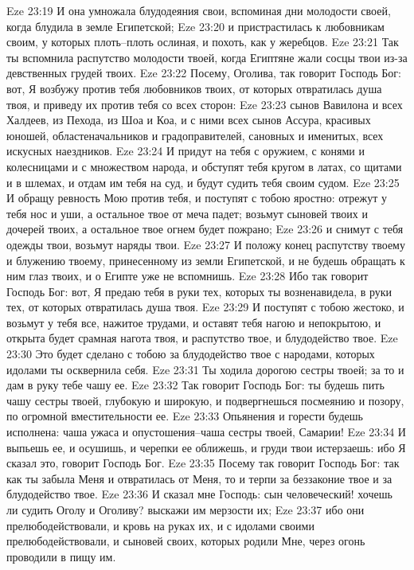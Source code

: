 Eze 23:19  И она умножала блудодеяния свои, вспоминая дни молодости своей, когда блудила в земле Египетской;
Eze 23:20  и пристрастилась к любовникам своим, у которых плоть--плоть ослиная, и похоть, как у жеребцов.
Eze 23:21  Так ты вспомнила распутство молодости твоей, когда Египтяне жали сосцы твои из-за девственных грудей твоих.
Eze 23:22  Посему, Оголива, так говорит Господь Бог: вот, Я возбужу против тебя любовников твоих, от которых отвратилась душа твоя, и приведу их против тебя со всех сторон:
Eze 23:23  сынов Вавилона и всех Халдеев, из Пехода, из Шоа и Коа, и с ними всех сынов Ассура, красивых юношей, областеначальников и градоправителей, сановных и именитых, всех искусных наездников.
Eze 23:24  И придут на тебя с оружием, с конями и колесницами и с множеством народа, и обступят тебя кругом в латах, со щитами и в шлемах, и отдам им тебя на суд, и будут судить тебя своим судом.
Eze 23:25  И обращу ревность Мою против тебя, и поступят с тобою яростно: отрежут у тебя нос и уши, а остальное твое от меча падет; возьмут сыновей твоих и дочерей твоих, а остальное твое огнем будет пожрано;
Eze 23:26  и снимут с тебя одежды твои, возьмут наряды твои.
Eze 23:27  И положу конец распутству твоему и блужению твоему, принесенному из земли Египетской, и не будешь обращать к ним глаз твоих, и о Египте уже не вспомнишь.
Eze 23:28  Ибо так говорит Господь Бог: вот, Я предаю тебя в руки тех, которых ты возненавидела, в руки тех, от которых отвратилась душа твоя.
Eze 23:29  И поступят с тобою жестоко, и возьмут у тебя все, нажитое трудами, и оставят тебя нагою и непокрытою, и открыта будет срамная нагота твоя, и распутство твое, и блудодейство твое.
Eze 23:30  Это будет сделано с тобою за блудодейство твое с народами, которых идолами ты осквернила себя.
Eze 23:31  Ты ходила дорогою сестры твоей; за то и дам в руку тебе чашу ее.
Eze 23:32  Так говорит Господь Бог: ты будешь пить чашу сестры твоей, глубокую и широкую, и подвергнешься посмеянию и позору, по огромной вместительности ее.
Eze 23:33  Опьянения и горести будешь исполнена: чаша ужаса и опустошения--чаша сестры твоей, Самарии!
Eze 23:34  И выпьешь ее, и осушишь, и черепки ее оближешь, и груди твои истерзаешь: ибо Я сказал это, говорит Господь Бог.
Eze 23:35  Посему так говорит Господь Бог: так как ты забыла Меня и отвратилась от Меня, то и терпи за беззаконие твое и за блудодейство твое.
Eze 23:36  И сказал мне Господь: сын человеческий! хочешь ли судить Оголу и Оголиву? выскажи им мерзости их;
Eze 23:37  ибо они прелюбодействовали, и кровь на руках их, и с идолами своими прелюбодействовали, и сыновей своих, которых родили Мне, через огонь проводили в пищу им.
